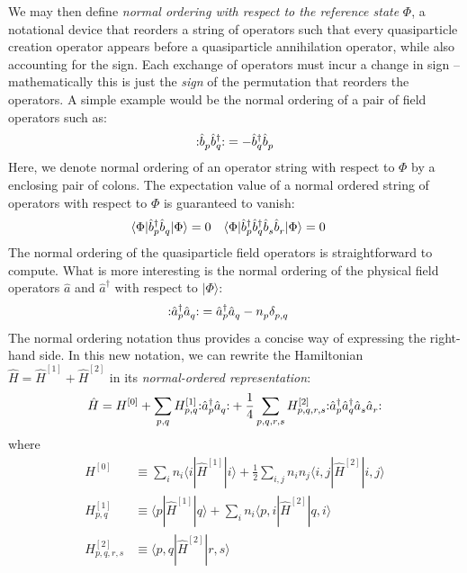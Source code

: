 We may then define \emph{normal ordering with respect to the reference state} $\Phi$, a notational device that reorders a string of operators such that every quasiparticle creation operator appears before a quasiparticle annihilation operator, while also accounting for the sign.  Each exchange of operators must incur a change in sign -- mathematically this is just the \textit{sign} of the permutation that reorders the operators.  A simple example would be the normal ordering of a pair of field operators such as:
\begin{align*}
  \mathopen: \hat{b}_p^{} \hat{b}_q^\dagger \mathclose: =
  -\hat{b}_q^\dagger \hat{b}_p^{}
\end{align*}
Here, we denote normal ordering of an operator string with respect to $\Phi$ by a enclosing pair of colons.  The expectation value of a normal ordered string of operators with respect to $\Phi$ is guaranteed to vanish:
\begin{align*}
&\langle \Phi | \hat{b}_p^\dagger \hat{b}_q^{} | \Phi \rangle = 0 &
&\langle \Phi | \hat{b}_p^\dagger \hat{b}_q^\dagger \hat{b}_s^{} \hat{b}_r^{} | \Phi \rangle = 0
\end{align*}
The normal ordering of the quasiparticle field operators is straightforward to compute.  What is more interesting is the normal ordering of the physical field operators $\hat a$ and $\hat a^\dagger$ with respect to $|\Phi\rangle$:
\begin{align*}
  \mathopen: \hat{a}_p^\dagger \hat{a}_q^{} \mathclose: &=
  \hat{a}_p^\dagger \hat{a}_q^{} - n_p^{} \delta_{p, q}^{}
\end{align*}
The normal ordering notation thus provides a concise way of expressing the right-hand side.  In this new notation, we can rewrite the Hamiltonian $\hat H = \hat{H}^{[1]} + \hat{H}^{[2]}$ in its \emph{normal-ordered representation}:
\begin{align}
  \hat{H} = H^{[0]} + \sum_{p, q} H^{[1]}_{p, q} \mathopen: \hat{a}_p^\dagger \hat{a}_q^{} \mathclose: + \frac{1}{4} \sum_{p, q, r, s} H^{[2]}_{p, q, r, s} \mathopen: \hat{a}_p^\dagger \hat{a}_q^\dagger \hat{a}_s^{} \hat{a}_r^{} \mathclose:
  \label{eq:normordhamiltonian}
\end{align}
where
\begin{align*}
  H^{[0]} &\equiv \sum_{i} n_i \langle i | \hat{H}^{[1]} | i \rangle + \frac{1}{2} \sum_{i, j} n_i n_j \langle i, j | \hat{H}^{[2]} | i , j \rangle \\
  H^{[1]}_{p, q} &\equiv \langle p | \hat{H}^{[1]} | q \rangle + \sum_{i} n_i \langle p, i | \hat{H}^{[2]} | q, i \rangle \\
  H^{[2]}_{p, q, r, s} &\equiv \langle p, q | \hat{H}^{[2]} | r, s \rangle \\
\end{align*}
